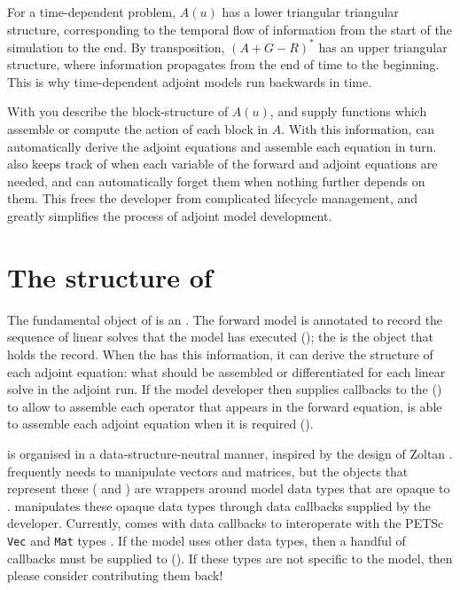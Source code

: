 For a time-dependent problem, $A(u)$ has a lower triangular triangular structure,
corresponding to the temporal flow of information from the start of the simulation
to the end. By transposition, $(A + G - R)^*$ has an upper triangular structure, where
information propagates from the end of time to the beginning. This is why time-dependent adjoint
models run backwards in time.

With \libadjoint you describe the block-structure of $A(u)$,
and supply functions which assemble or compute the action of each block in $A$.
With this information, \libadjoint can automatically derive the adjoint equations
and assemble each equation in turn. \libadjoint also keeps track of when each
variable of the forward and adjoint equations are needed, and can automatically
forget them when nothing further depends on them. This frees the developer from
complicated lifecycle management, and greatly simplifies the process of adjoint model
development.

\section{The structure of \libadjoint}
The fundamental object of \libadjoint is an . The forward model is annotated
to record the sequence of linear solves that the model has executed (); the  is
the object that holds the record. When the  has this information, it can derive
the structure of each adjoint equation: what should be assembled or differentiated for each linear
solve in the adjoint run. If the model developer then
supplies callbacks to the  () to allow \libadjoint to assemble each
operator that appears in the forward equation, \libadjoint is
able to assemble each adjoint equation when it is required ().

\libadjoint is organised in a data-structure-neutral manner, inspired by the design
of Zoltan \citep{devine2002}. \libadjoint frequently needs to manipulate vectors
and matrices, but the objects that represent these ( and )
are wrappers around model data types that are opaque to \libadjoint. \libadjoint manipulates
these opaque data types through data callbacks supplied by the developer. Currently, \libadjoint
{}
comes with data callbacks to interoperate with the PETSc \texttt{Vec} and \texttt{Mat} types \citep{balay2010}.
If the model uses other data types, then a handful of callbacks must be supplied to \libadjoint ().
If these types are not specific to the model, then please consider contributing them back!

